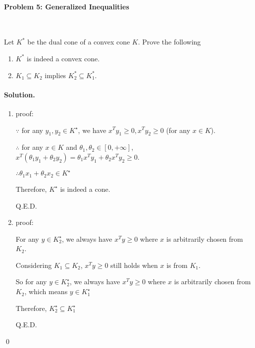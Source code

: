\documentclass[a4paper]{article}
\newenvironment{solution}
{\color{blue} \paragraph{Solution.}}
{\newline \qed}
\begin{document}
\paragraph{Problem 5: Generalized Inequalities}
~

Let $K^*$ be the dual cone of a convex cone $K$. Prove the following
\begin{enumerate}[1)]
    \item $K^*$ is indeed a convex cone.
    \item $K_1 \subseteq K_2$ implies $K_2^* \subseteq K_1^*$.
\end{enumerate}

\begin{solution}
    \begin{enumerate}[1)]
        \item proof:
        
        $\because $ for any $y_1, y_2\in K^\star $, we have $x^Ty_1\geq 0,x^Ty_2\geq 0$ (for any $x\in K$).

        $\therefore $ for any $x \in K$ and $\theta_1,\theta_2 \in [0,+\infty]$, $x^T(\theta_1 y_1+\theta_2y_2)=\theta_1 x^Ty_1+\theta_2x^Ty_2\geq0$.

        $\therefore \theta_1x_1+\theta_2x_2\in K^\star$

        Therefore, $K^\star$ is indeed a cone.

        Q.E.D.

        \item proof:
        
        For any $y\in K_2^\star$, we always have $x^Ty\geq0$ where $x$ is arbitrarily chosen from $K_2$.

        Considering $K_1\subseteq K_2$, $x^Ty\geq 0$ still holds when $x$ is from $K_1$.

        So for any $y\in K_2^\star$, we always have $x^Ty\geq0$ where $x$ is arbitrarily chosen from $K_2$, which means $y\in K_1^\star$

        Therefore, $K_2^\star \subseteq K_1^\star$

        Q.E.D.


    \end{enumerate}
\end{solution}
\end{document}
